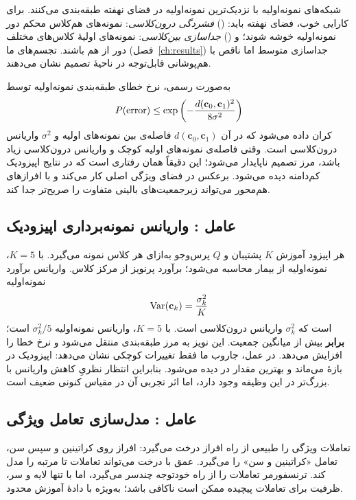 شبکه‌های نمونه‌اولیه با نزدیک‌ترین نمونه‌اولیه در فضای نهفته طبقه‌بندی می‌کنند. برای کارایی خوب، فضای نهفته باید: () \emph{فشردگی درون‌کلاسی}: نمونه‌های هم‌کلاس محکم دور نمونه‌اولیه خوشه شوند؛ و () \emph{جداسازی بین‌کلاسی}: نمونه‌های اولیۀ کلاس‌های مختلف دور از هم باشند. تجسم‌های  ما (فصل~\ref{ch:results}) جداسازی متوسط اما ناقص با هم‌پوشانی قابل‌توجه در ناحیۀ تصمیم نشان می‌دهند.

به‌صورت رسمی، نرخ خطای طبقه‌بندی نمونه‌اولیه توسط
\begin{equation}
P(\text{error}) \leq \exp\left(-\frac{d(\mathbf{c}_0, \mathbf{c}_1)^2}{8\sigma^2}\right)
\end{equation}
کران داده می‌شود که در آن $d(\mathbf{c}_0, \mathbf{c}_1)$ فاصله‌ی بین نمونه‌های اولیه و $\sigma^2$ واریانس درون‌کلاسی است. وقتی فاصله‌ی نمونه‌های اولیه کوچک و واریانس درون‌کلاسی زیاد باشد، مرز تصمیم ناپایدار می‌شود؛ این دقیقاً همان رفتاری است که در نتایج اپیزودیک کم‌دامنه دیده می‌شود.  برعکس در فضای ویژگی اصلی کار می‌کند و با افرازهای هم‌محور می‌تواند زیرجمعیت‌های بالینی متفاوت را صریح‌تر جدا کند.

\subsection{عامل : واریانس نمونه‌برداری اپیزودیک}

هر اپیزود آموزش $K$ پشتیبان و $Q$ پرس‌وجو به‌ازای هر کلاس نمونه می‌گیرد. با $K=5$، نمونه‌اولیه از  بیمار محاسبه می‌شود؛ برآورد پرنویز از مرکز کلاس. واریانس برآورد نمونه‌اولیه
\begin{equation}
\text{Var}(\mathbf{c}_k) = \frac{\sigma_k^2}{K}
\end{equation}
است که $\sigma_k^2$ واریانس درون‌کلاسی است. با $K=5$، واریانس نمونه‌اولیه $\sigma_k^2/5$ است؛ \textbf{ برابر} بیش از میانگین جمعیت. این نویز به مرز طبقه‌بندی منتقل می‌شود و نرخ خطا را افزایش می‌دهد. در عمل، جاروب  ما فقط تغییرات کوچکی نشان می‌دهد:  اپیزودیک در بازۀ  می‌ماند و بهترین مقدار در  دیده می‌شود. بنابراین انتظار نظریِ کاهش واریانس با  بزرگ‌تر در این وظیفه وجود دارد، اما اثر تجربی آن در مقیاس کنونی ضعیف است.

\subsection{عامل : مدل‌سازی تعامل ویژگی}

 تعاملات ویژگی را طبیعی از راه افراز درخت می‌گیرد: افراز روی کراتینین و سپس سن، تعامل «کراتینین و سن» را می‌گیرد.  عمق  با  درخت می‌تواند تعاملات تا مرتبه  را مدل کند. ترنسفورمر  تعاملات را از راه خودتوجه چندسر می‌گیرد، اما با تنها  لایه و  سر، ظرفیت برای تعاملات پیچیده ممکن است ناکافی باشد؛ به‌ویژه با دادۀ آموزش محدود.

